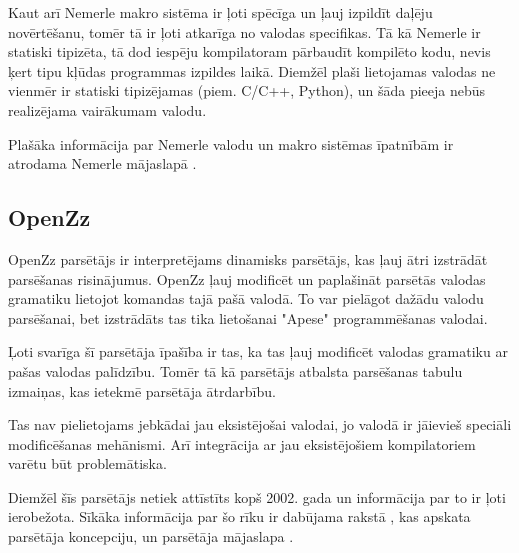 Kaut arī Nemerle makro sistēma ir ļoti spēcīga un ļauj izpildīt daļēju novērtēšanu, tomēr tā ir ļoti atkarīga no valodas specifikas. Tā kā Nemerle ir statiski tipizēta, tā dod iespēju kompilatoram pārbaudīt kompilēto kodu, nevis ķert tipu kļūdas programmas izpildes laikā. Diemžēl plaši lietojamas valodas ne vienmēr ir statiski tipizējamas (piem. C/C++, Python), un šāda pieeja nebūs realizējama vairākumam valodu.

Plašāka informācija par Nemerle valodu un makro sistēmas īpatnībām ir atrodama Nemerle mājaslapā \cite{NemerleWiki}.

\subsection{\label{sbs:rel_openzz}OpenZz}

OpenZz parsētājs ir interpretējams dinamisks parsētājs, kas ļauj ātri izstrādāt parsēšanas risinājumus. OpenZz ļauj modificēt un paplašināt parsētās valodas gramatiku lietojot komandas tajā pašā valodā. To var pielāgot dažādu valodu parsēšanai, bet izstrādāts tas tika lietošanai "Apese" programmēšanas valodai.

Ļoti svarīga šī parsētāja īpašība ir tas, ka tas ļauj modificēt valodas gramatiku ar pašas valodas palīdzību. Tomēr tā kā parsētājs atbalsta parsēšanas tabulu izmaiņas, kas ietekmē parsētāja ātrdarbību.

Tas nav pielietojams jebkādai jau eksistējošai valodai, jo valodā ir jāievieš speciāli modificēšanas mehānismi. Arī integrācija ar jau eksistējošiem kompilatoriem varētu būt problemātiska.

Diemžēl šīs parsētājs netiek attīstīts kopš 2002. gada un informācija par to ir ļoti ierobežota. Sīkāka informācija par šo rīku ir dabūjama rakstā \cite{Cabasino:DynamicParsers}, kas apskata parsētāja koncepciju, un parsētāja mājaslapa \cite{OpenZZParser}.